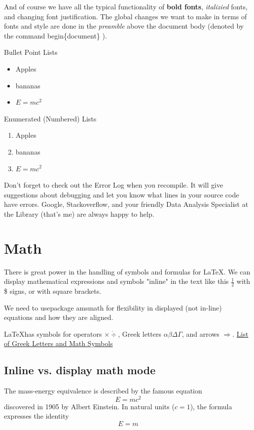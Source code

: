 \documentclass{article}
\begin{document}
And of course we have all the typical functionality of \textbf{bold fonts}, \textit{italizied} fonts, and changing font justification.  The global changes we want to make in terms of fonts and style are done in the \emph{preamble} above the document body (denoted by the command begin\{document\} ).

Bullet Point Lists
\begin{itemize}
    \item Apples
    \item bananas
    \item $E=mc^2$
\end{itemize}

Enumerated (Numbered) Lists
\begin{enumerate}
    \item Apples
    \item bananas
    \item $E=mc^2$
\end{enumerate}

Don't forget to check out the Error Log when you recompile.  It will give suggestions about debugging and let you know what lines in your source code have errors.  Google, Stackoverflow, and your friendly Data Analysis Specialist at the Library (that's me) are always happy to help.


\section{Math}
There is great power in the handling of symbols and formulas for LaTeX.  We can display mathematical expressions and symbols "inline" in the text like this $\frac{1}{2}$ with \$ signs, or with square brackets.

We need to usepackage amsmath for flexibility in displayed (not in-line) equations and how they are aligned.  

\LaTeX has symbols for operators $\times \dot \div$, Greek letters $\alpha \beta \Delta \Gamma$, and arrows $\Rightarrow$.
\href{https://www.overleaf.com/learn/latex/List_of_Greek_letters_and_math_symbols}{List of Greek Letters and Math Symbols}


\subsection{Inline vs. display math mode}
The mass-energy equivalence is described by the famous equation \[ E=mc^2 \]
discovered in 1905 by Albert Einstein. 
In natural units ($c = 1$), the formula expresses the identity
\begin{equation}
E=m
\end{equation}
\end{document}

